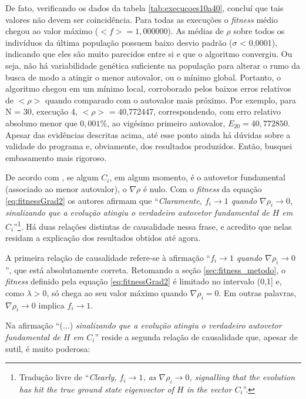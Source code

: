 	De fato, verificando os dados da tabela \ref{tab:execucoes10a40}, concluí que tais valores não devem ser coincidência. Para todas as execuções o \textit{fitness} médio chegou ao valor máximo ($<f> = 1,000000$). As médias de $\rho$ sobre todos os indivíduos da última população possuem baixo desvio padrão ($\sigma$ < 0,0001), indicando que eles são muito parecidos entre si e que o algoritmo convergiu. Ou seja, não há variabilidade genética suficiente na população para alterar o rumo da busca de modo a atingir o menor autovalor, ou o mínimo global. Portanto, o algoritmo chegou em um mínimo local, corroborado pelos baixos erros relativos de $<\rho>$ quando comparado com o autovalor mais próximo. Por exemplo, para N = 30, execução 4,  $<\rho>$ = 40,772447, correspondendo, com erro relativo absoluno menor que $0,001\%$, ao vigésimo primeiro autovalor, $E_{20} = 40,772850$. Apesar das evidências descritas acima, até esse ponto ainda há dúvidas sobre a validade do programa e, obviamente, dos resultados produzidos. Então, busquei embasamento mais rigoroso.

De acordo com \cite{metodo2004}, se algum $C_i$, em algum momento, é o autovetor fundamental (associado ao menor autovalor), o $\nabla \rho$ é nulo. Com o \textit{fitness} da equação \eqref{eq:fitnessGrad2} os autores afirmam que ``\textit{Claramente, $f_i \rightarrow 1$ quando $\nabla \rho_i \rightarrow 0$, sinalizando que a evolução atingiu o verdadeiro autovetor fundamental de $H$ em $C_i$}''\footnote{Tradução livre de ``\textit{Clearly, $f_i \rightarrow 1$, as $\nabla \rho_i \rightarrow 0$, signalling that the evolution has hit the true ground state eigenvector of $H$ in the vector $C_i$}''.}. Há duas relações distintas de causalidade nessa frase, e acredito que nelas residam a explicação dos resultados obtidos até agora.

A primeira relação de causalidade refere-se à afirmação ``\textit{$f_i \rightarrow 1$ quando $\nabla \rho_i \rightarrow 0$}'', que está absolutamente correta. Retomando a seção \ref{sec:fitness_metodo}, o \textit{fitness} definido pela equação \ref{eq:fitnessGrad2} é limitado no intervalo (0,1] e, como $\lambda > 0$, só chega ao seu valor máximo quando $\nabla \rho_i = 0$. Em outras palavras, $\nabla \rho_i \rightarrow 0$ implica $f_i \rightarrow 1$.

Na afirmação ``(...) \textit{sinalizando que a evolução atingiu o verdadeiro autovetor fundamental de $H$ em $C_i$}'' reside a segunda relação de causalidade que, apesar de sutil, é muito poderosa:


